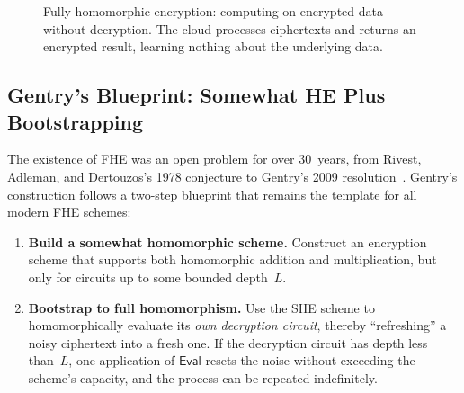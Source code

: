 \begin{figure}[t]
\centering
{}
\caption{Fully homomorphic encryption: computing on encrypted data without decryption.  The cloud processes ciphertexts and returns an encrypted result, learning nothing about the underlying data.}
\label{fig:ch14-fhe-cloud}
\end{figure}


\subsection{Gentry's Blueprint: Somewhat HE Plus Bootstrapping}
\label{subsec:gentry-blueprint}

The existence of FHE was an open problem for over 30~years, from Rivest, Adleman, and Dertouzos's 1978 conjecture to Gentry's 2009 resolution~\cite{Gentry2009}.  Gentry's construction follows a two-step blueprint that remains the template for all modern FHE schemes:

\begin{enumerate}
\item \textbf{Build a somewhat homomorphic scheme.}  Construct an encryption scheme that supports both homomorphic addition and multiplication, but only for circuits up to some bounded depth~$L$.

\item \textbf{Bootstrap to full homomorphism.}  Use the SHE scheme to homomorphically evaluate its \emph{own decryption circuit}, thereby ``refreshing'' a noisy ciphertext into a fresh one.  If the decryption circuit has depth less than~$L$, one application of $\mathsf{Eval}$ resets the noise without exceeding the scheme's capacity, and the process can be repeated indefinitely.
\end{enumerate}


